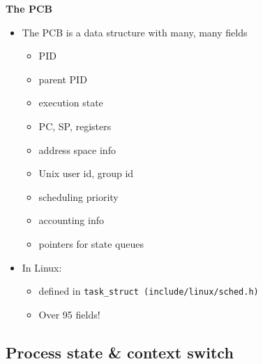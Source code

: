 \documentclass[11pt,a4paper]{article}
\begin{document}
\textbf{The PCB}
\begin{itemize}
    \item The PCB is a data structure with many, many fields
        \begin{itemize}
            \item PID
            \item parent PID
            \item execution state
            \item PC, SP, registers
            \item address space info
            \item Unix user id, group id
            \item scheduling priority
            \item accounting info
            \item pointers for state queues
        \end{itemize}
    \item In Linux:
        \begin{itemize}
            \item defined in \texttt{task\_struct (include/linux/sched.h)}
            \item Over 95 fields!
        \end{itemize}
\end{itemize}

\subsection{Process state \& context switch}
\end{document}
